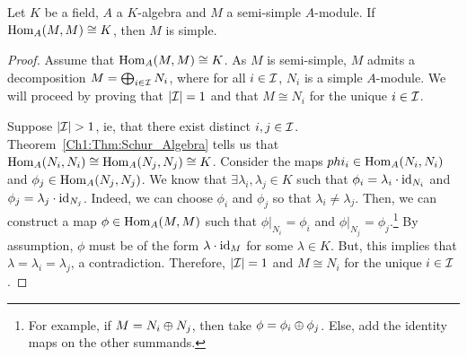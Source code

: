 \begin{theorem}\label{Ch1:Thm:Schur_Algebra_Converse}
    Let $K$ be a field, $A$ a $K$-algebra and $M$ a semi-simple $A$-module. If $\operatorname{Hom}_A(M,M) \cong K$, then $M$ is simple.
\end{theorem}
\begin{proof}
    Assume that $\operatorname{Hom}_A(M, M) \cong K$. As $M$ is semi-simple, $M$ admits a decomposition $M = \bigoplus_{i \in \mathcal{I}} N_i$, where for all $i \in \mathcal{I}$, $N_i$ is a simple $A$-module. We will proceed by proving that $\left\lvert \mathcal{I} \right\rvert = 1$ and that $M \cong N_i$ for the unique $i \in \mathcal{I}$.

    Suppose $\left\lvert \mathcal{I} \right\rvert > 1$, ie, that there exist distinct $i, j \in \mathcal{I}$. Theorem~\ref{Ch1:Thm:Schur_Algebra} tells us that $\operatorname{Hom}_A(N_i, N_i) \cong \operatorname{Hom}_A(N_j, N_j) \cong K$. Consider the maps $phi_i \in \operatorname{Hom}_A(N_i, N_i)$ and $\phi_j \in \operatorname{Hom}_A(N_j, N_j)$. We know that $\exists \lambda_i, \lambda_j \in K$ such that $\phi_i = \lambda_i \cdot \operatorname{id}_{N_i}$ and $\phi_j = \lambda_j \cdot \operatorname{id}_{N_j}$. Indeed, we can choose $\phi_i$ and $\phi_j$ so that $\lambda_i \neq \lambda_j$. Then, we can construct a map $\phi \in \operatorname{Hom}_A(M, M)$ such that $\phi\vert_{N_i} = \phi_i$ and $\phi\vert_{N_j} = \phi_j$.\footnote{For example, if $M = N_i \oplus N_j$, then take $\phi = \phi_i \oplus \phi_j$. Else, add the identity maps on the other summands.} By assumption, $\phi$ must be of the form $\lambda \cdot \operatorname{id}_M$ for some $\lambda \in K$. But, this implies that $\lambda = \lambda_i = \lambda_j$, a contradiction. Therefore, $\left\lvert \mathcal{I} \right\rvert = 1$ and $M \cong N_i$ for the unique $i \in \mathcal{I}$.
\end{proof}

